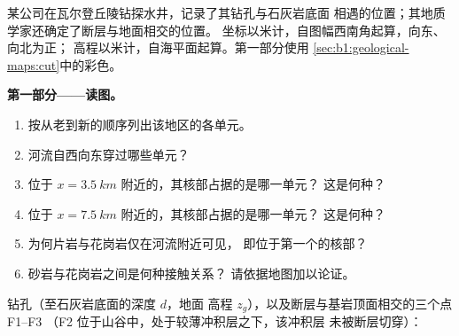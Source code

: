 \begin{problem}
\label{pb:b1:geological-maps:1}
某公司在瓦尔登丘陵钻探水井，记录了其钻孔与石灰岩底面
相遇的位置；其地质学家还确定了断层与地面相交的位置。
坐标以米计，自图幅西南角起算，向东、向北为正；
高程以米计，自海平面起算。第一部分使用
\cref{sec:b1:geological-maps:cut}中的彩色。

\medskip
\noindent\textbf{第一部分——读图。}
\begin{enumerate}
  \item 按从老到新的顺序列出该地区的各单元。
  \item 河流自西向东穿过哪些单元？
  \item 位于 $x = \qty{3.5}{km}$ 附近的，其核部占据的是哪一单元？
        这是何种？
  \item 位于 $x = \qty{7.5}{km}$ 附近的，其核部占据的是哪一单元？
        这是何种？
  \item 为何片岩与花岗岩仅在河流附近可见，
        即位于第一个的核部？
  \item 砂岩与花岗岩之间是何种接触关系？
        请依据地图加以论证。
\end{enumerate}

\medskip
\noindent 钻孔（至石灰岩底面的深度 $d$，地面
高程 $z_g$），以及断层与基岩顶面相交的三个点 F1--F3
（F2 位于山谷中，处于较薄冲积层之下，该冲积层
未被断层切穿）：


\end{problem}
